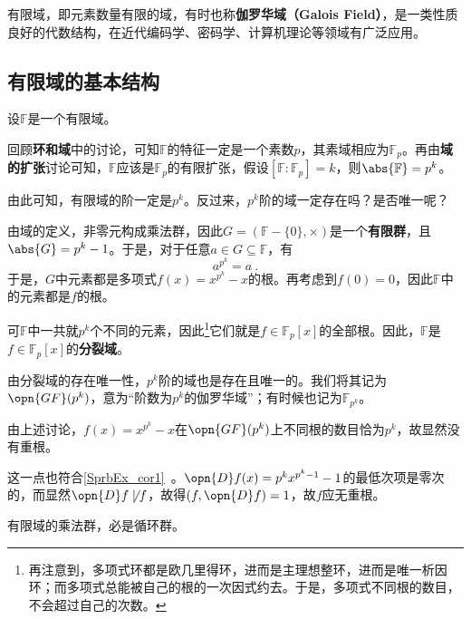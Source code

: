 


有限域，即元素数量有限的域，有时也称\textbf{伽罗华域（Galois Field）}，是一类性质良好的代数结构，在近代编码学、密码学、计算机理论等领域有广泛应用。

\subsection{有限域的基本结构}

设$\mathbb{F}$是一个有限域。

回顾\textbf{环和域}中的讨论，可知$\mathbb{F}$的特征一定是一个素数$p$，其素域相应为$\mathbb{F}_p$。再由\textbf{域的扩张}讨论可知，$\mathbb{F}$应该是$\mathbb{F}_p$的有限扩张，假设$[\mathbb{F}:\mathbb{F}_p]=k$，则$\abs{\mathbb{F}}=p^k$。

由此可知，有限域的阶一定是$p^k$。反过来，$p^k$阶的域一定存在吗？是否唯一呢？

由域的定义，非零元构成乘法群，因此$G=(\mathbb{F}-\{0\}, \times)$是一个\textbf{有限群}，且$\abs{G}=p^k-1$。于是，对于任意$a\in G\subseteq\mathbb{F}$，有
\begin{equation}
a^{p^k}=a~.
\end{equation}
于是，$G$中元素都是多项式$f(x)=x^{p^k}-x$的根。再考虑到$f(0)=0$，因此$\mathbb{F}$中的元素都是$f$的根。

可$\mathbb{F}$中一共就$p^k$个不同的元素，因此\footnote{再注意到，多项式环都是欧几里得环，进而是主理想整环，进而是唯一析因环；而多项式总能被自己的根的一次因式约去。于是，多项式不同根的数目，不会超过自己的次数。}它们就是$f\in\mathbb{F}_p[x]$的全部根。因此，$\mathbb{F}$是$f\in\mathbb{F}_p[x]$的\textbf{分裂域}。

由分裂域的存在唯一性，$p^k$阶的域也是存在且唯一的。我们将其记为$\opn{GF}(p^k)$，意为“阶数为$p^k$的伽罗华域”；有时候也记为$\mathbb{F}_{p^k}$。

\begin{example}{}
由上述讨论，$f(x)=x^{p^k}-x$在$\opn{GF}(p^k)$上不同根的数目恰为$p^k$，故显然没有重根。

这一点也符合\autoref{SprbEx_cor1}~。$\opn{D}f(x)=p^kx^{p^k-1}-1$的最低次项是零次的，而显然$\opn{D}f\not\mid f$，故得$(f, \opn{D}f)=1$，故$f$应无重根。
\end{example}


\begin{theorem}{}\label{FntFld_the1}
有限域的乘法群，必是循环群。
\end{theorem}

